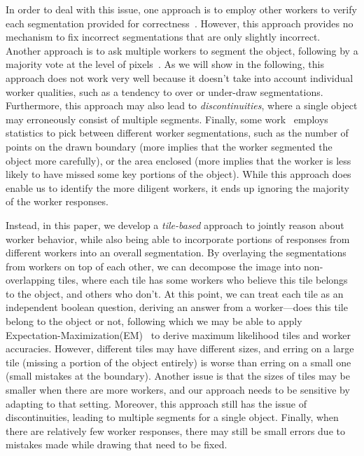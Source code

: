 \documentclass[letterpaper]{article} %
\begin{document}
In order to deal with this issue, one approach
is to employ other workers to verify each segmentation 
provided for correctness~\cite{imagenet, mscoco, 
crowdsourcing-annotations}.
However, this approach provides 
no mechanism to fix incorrect
segmentations that are only slightly incorrect.
Another approach is to ask multiple workers to segment the object,
following by a 
majority vote at the level of pixels~\cite{xxx}.
As we will show in the following, 
this approach does not work very well
because it doesn't take into account 
individual worker qualities,
such as a tendency to over or under-draw segmentations.
Furthermore, this approach may also lead to {\em discontinuities},
where a single object may erroneously consist of multiple segments.
Finally, some work~\cite{Vittayakorn2011} employs statistics
to pick between different worker segmentations, 
such as the number of points on the 
drawn boundary (more implies
that the worker segmented the object more carefully),
or the area enclosed (more implies 
that the worker is less likely
to have missed some key portions of the object). 
While this approach does enable us to identify
the more diligent workers, it ends up ignoring
the majority of the worker responses. 


Instead, in this paper, we develop a 
{\em tile-based} approach to jointly reason about
worker behavior, while also being able to incorporate
portions of responses from different workers into
an overall segmentation.
By overlaying the segmentations from workers 
on top of each other, we
can decompose the image into non-overlapping tiles,
where each tile has some workers who believe this tile
belongs to the object, and others who don't.
At this point, we can treat each tile as an independent
boolean question, deriving an answer from a worker---does
this tile belong to the object or not, following
which we may be able to apply Expectation-Maximization(EM)~\cite{Dawid1979}
to derive maximum likelihood tiles and worker accuracies.
However, different tiles may have different sizes,
and erring on a large tile (missing a portion of the object
entirely) is worse than erring on a small
one (small mistakes at the boundary). 
Another issue is that the sizes of tiles may be 
smaller when there are more workers, and our
approach needs to be sensitive by adapting to that setting. 
Moreover, this approach still has the issue of discontinuities,
leading to multiple segments for a single object. 
Finally, when there are relatively few worker responses,
there may still be small errors due to mistakes made
while drawing that need to be fixed. 
\end{document}
